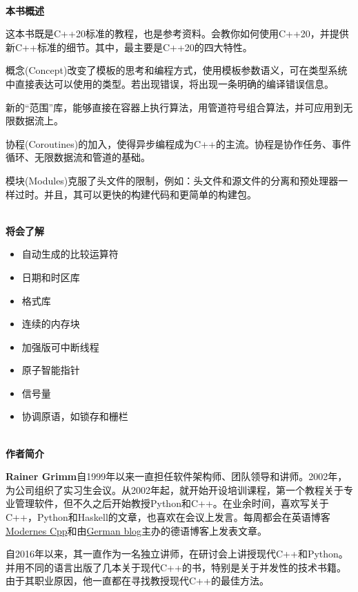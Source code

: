 \documentclass[11pt,a4paper,UTF8]{book}
\begin{document}
\begin{sloppypar}
  \hspace*{\fill} \\ %
  \noindent\textbf{本书概述}
  
  这本书既是C++20标准的教程，也是参考资料。会教你如何使用C++20，并提供新C++标准的细节。其中，最主要是C++20的四大特性。

  概念(Concept)改变了模板的思考和编程方式，使用模板参数语义，可在类型系统中直接表达可以使用的类型。若出现错误，将出现一条明确的编译错误信息。

  新的“范围”库，能够直接在容器上执行算法，用管道符号组合算法，并可应用到无限数据流上。

  协程(Coroutines)的加入，使得异步编程成为C++的主流。协程是协作任务、事件循环、无限数据流和管道的基础。

  模块(Modules)克服了头文件的限制，例如：头文件和源文件的分离和预处理器一样过时。并且，其可以更快的构建代码和更简单的构建包。

  \hspace*{\fill} \\ %
  \noindent\textbf{将会了解}
  \begin{itemize}
    \item 自动生成的比较运算符
    \item 日期和时区库
    \item 格式库
    \item 连续的内存块
    \item 加强版可中断线程
    \item 原子智能指针
    \item 信号量
    \item 协调原语，如锁存和栅栏
  \end{itemize}
  
  \hspace*{\fill} \\ %
  \noindent\textbf{作者简介}
  
  \textbf{Rainer Grimm}自1999年以来一直担任软件架构师、团队领导和讲师。2002年，为公司组织了实习生会议。从2002年起，就开始开设培训课程，第一个教程关于专业管理软件，但不久之后开始教授Python和C++。在业余时间，喜欢写关于C++，Python和Haskell的文章，也喜欢在会议上发言。每周都会在英语博客\href{https://www.modernescpp.com/}{Modernes Cpp}和由\href{https://www.grimm-jaud.de/index.php/blog}{German blog}主办的德语博客上发表文章。
  
  自2016年以来，其一直作为一名独立讲师，在研讨会上讲授现代C++和Python。并用不同的语言出版了几本关于现代C++的书，特别是关于并发性的技术书籍。由于其职业原因，他一直都在寻找教授现代C++的最佳方法。
  

\end{sloppypar}
\end{document}
